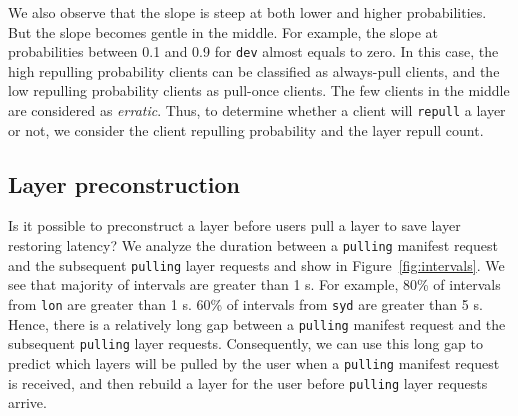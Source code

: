 We also observe that the slope is steep at both lower and higher probabilities.
But the slope becomes gentle in the middle.
For example, 
the slope at probabilities between 0.1 and 0.9 for \texttt{dev} almost equals to zero.
In this case,
the high repulling probability clients can be classified as always-pull clients, 
and the low repulling probability clients as pull-once clients. 
The few clients in the middle are considered as \emph{erratic}.
%
Thus,
to determine whether a client will \texttt{repull} a layer or not,
we consider the client repulling probability and the layer repull count.



\subsection{Layer preconstruction}

%
Is it possible to 
preconstruct a layer before users pull a layer to save layer restoring latency?
We analyze the duration between a \texttt{pulling} manifest request and the subsequent \texttt{pulling} layer requests
and show in Figure~\ref{fig:intervals}.
We see that 
majority of intervals are greater than 1 s.
For example, 80\% of intervals from \texttt{lon} are greater than 1 s.
60\% of intervals from \texttt{syd} are greater than 5 s.
Hence,
there is a relatively long gap between a \texttt{pulling} manifest request and the subsequent \texttt{pulling} layer requests.
Consequently,
we can use this long gap to predict which layers will be pulled by the user
when a \texttt{pulling} manifest request is received,
 and then 
rebuild a layer for the user before \texttt{pulling} layer requests arrive.

